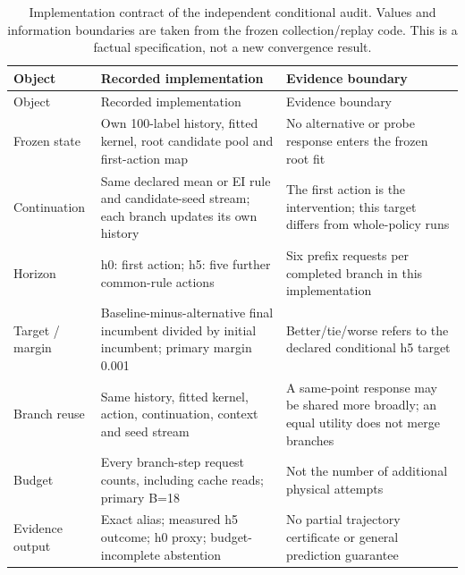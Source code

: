 \FloatBarrier\begingroup\fontsize{8.5}{10.5}\selectfont\setlength\tabcolsep{3pt}
\begin{longtable}{@{}>{\raggedright\arraybackslash}p{}>{\raggedright\arraybackslash}p{}>{\raggedright\arraybackslash}p{}@{}}
\caption{Implementation contract of the independent conditional audit. Values and information boundaries are taken from the frozen collection/replay code. This is a factual specification, not a new convergence result.}\label{tab:review_contract}\tabularnewline
\toprule
Object & Recorded implementation & Evidence boundary \\
\midrule
\endfirsthead
\toprule
Object & Recorded implementation & Evidence boundary \\
\midrule
\endhead
\bottomrule
\endlastfoot
Frozen state & Own 100-label history, fitted kernel, root candidate pool and first-action map & No alternative or probe response enters the frozen root fit \\
Continuation & Same declared mean or EI rule and candidate-seed stream; each branch updates its own history & The first action is the intervention; this target differs from whole-policy runs \\
Horizon & h0: first action; h5: five further common-rule actions & Six prefix requests per completed branch in this implementation \\
Target / margin & Baseline-minus-alternative final incumbent divided by initial incumbent; primary margin 0.001 & Better/tie/worse refers to the declared conditional h5 target \\
Branch reuse & Same history, fitted kernel, action, continuation, context and seed stream & A same-point response may be shared more broadly; an equal utility does not merge branches \\
Budget & Every branch-step request counts, including cache reads; primary B=18 & Not the number of additional physical attempts \\
Evidence output & Exact alias; measured h5 outcome; h0 proxy; budget-incomplete abstention & No partial trajectory certificate or general prediction guarantee \\
\end{longtable}
\endgroup

